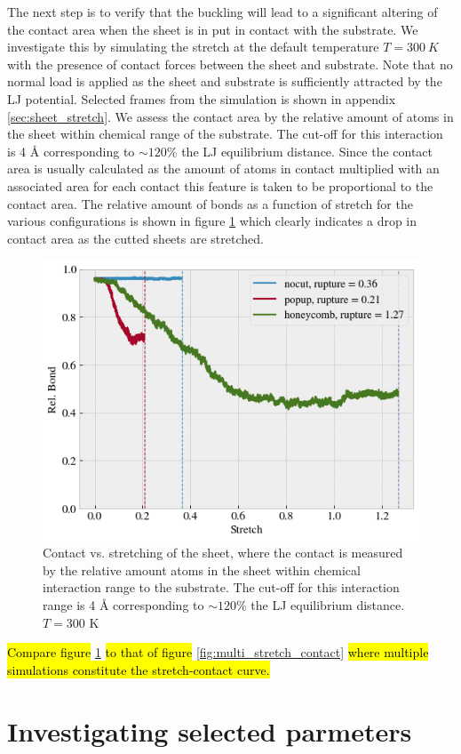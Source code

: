 The next step is to verify that the buckling will lead to a significant altering
of the contact area when the sheet is in put in contact with the substrate. We
investigate this by simulating the stretch at the default temperature $T =
\SI{300}{K}$ with the presence of contact forces between the sheet and
substrate. Note that no normal load is applied as the sheet and substrate is
sufficiently attracted by the LJ potential. Selected frames from the simulation is shown in appendix \ref{sec:sheet_stretch}. We assess the contact area by the
relative amount of atoms in the sheet within chemical range of the substrate.
The cut-off for this interaction is 4 Å corresponding to $\sim 120$\% the LJ
equilibrium distance. Since the contact area is usually calculated as the amount
of atoms in contact multiplied with an associated area for each contact this
feature is taken to be proportional to the contact area. The relative amount of
bonds as a function of stretch for the various configurations is shown in figure
\ref{fig:contact_vs_stretch} which clearly indicates a drop in contact area as
the cutted sheets are stretched. 

\begin{figure}[H]
  \centering
  \includegraphics[width=0.6\linewidth]{figures/baseline/contact_vs_stretch.png}
  \caption{Contact vs. stretching of the sheet, where the contact is measured by the relative amount atoms in the sheet within chemical interaction range to the substrate. The cut-off for this interaction range is 4 Å corresponding to $\sim 120 \%$ the LJ equilibrium distance. $T = 300$ K }
  \label{fig:contact_vs_stretch}
\end{figure}

\hl{Compare figure} \ref{fig:contact_vs_stretch} \hl{to that of figure} \ref{fig:multi_stretch_contact} \hl{where multiple simulations constitute the stretch-contact curve.}


\section{Investigating selected parmeters}

